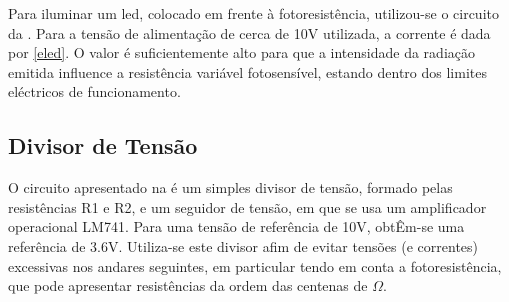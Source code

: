 \documentclass[%
  reprint,
  nofootinbib,
  amsmath,amssymb,
  aps,
  10pt,
  a4paper
]{revtex4-1}
\begin{document}
Para iluminar um led, colocado em frente à fotoresistência, utilizou-se o circuito da . Para a tensão de alimentação de cerca de 10V utilizada, a corrente é dada por \eqref{eled}. O valor é suficientemente alto para que a intensidade da radiação emitida influence a resistência variável fotosensível, estando dentro dos limites eléctricos de funcionamento.

	
	
\subsection{Divisor de Tensão}


O circuito apresentado na  é um simples divisor de tensão, formado pelas resistências R1 e R2, e um seguidor de tensão, em que se usa um amplificador operacional LM741. Para uma tensão de referência de 10V, obtÊm-se uma referência de 3.6V. Utiliza-se este divisor afim de evitar tensões (e correntes) excessivas nos andares seguintes, em particular tendo em conta a fotoresistência, que pode apresentar resistências da ordem das centenas de $\Omega$.
\end{document}
